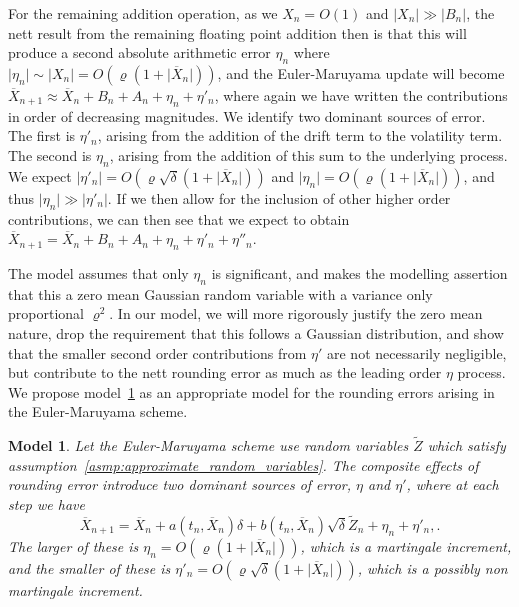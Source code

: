 \documentclass[manuscript,review]{acmart}
\newtheorem{model}{Model}[section]
\begin{document}
For the remaining addition operation, as we $ X_n = O(1) $ and $ \lvert X_n \rvert  \gg \lvert B_n \rvert  $, the nett result from the remaining floating point addition then is that this will produce a second absolute arithmetic error $ \eta_n $ where $ \lvert \eta_n \rvert  \sim \lvert X_n \rvert = O(\varrho (1 + \lvert \overline{X}_n\rvert ))$, and the Euler-Maruyama update will become
$ \overline{X}_{n+1} \approx \overline{X}_n + B_n + A_n + \eta_n + \eta'_n $, 
where again we have written the contributions in order of decreasing magnitudes. We identify two dominant sources of error. The first is $ \eta'_n $, arising from the addition of the drift term to the volatility term. The second is $ \eta_n $, arising from the addition of this sum to the underlying process.  We expect $ \lvert \eta'_n\rvert  = O(\varrho\sqrt{\delta} (1 + \lvert \overline{X}_n\rvert ))$ and $ \lvert \eta_n\rvert = O(\varrho (1 + \lvert \overline{X}_n\rvert ))$, and thus $ \lvert \eta_n\rvert  \gg \lvert \eta'_n\rvert  $.  If we then allow for the inclusion of other higher order contributions, we can then see that we expect to obtain
$ \overline{X}_{n+1} = \overline{X}_n + B_n + A_n + \eta_n + \eta'_n + \eta''_n $.

The \citet{arciniega2003rounding} model assumes that only $ \eta_n $ is significant, and makes the modelling assertion that this a zero mean Gaussian random variable with a variance only proportional $ \varrho^2 $. In our model, we will more rigorously justify the zero mean nature, drop the requirement that this follows a Gaussian distribution, and show that the smaller second order contributions from $ \eta' $ are not necessarily negligible, but contribute to the nett rounding error as much as the leading order $ \eta $ process. We propose model~\ref{model:rounding_errors} as an appropriate model for the rounding errors arising in the Euler-Maruyama scheme.  




\begin{model}
\label{model:rounding_errors}
Let the Euler-Maruyama scheme use random variables $ \widetilde{Z} $ which satisfy assumption~\ref{asmp:approximate_random_variables}. The composite effects of rounding error introduce two dominant sources of error, $ \eta $ and $ \eta' $, where at each step we have 
\begin{equation*}
\overline{X}_{n+1} = \overline{X}_n + a(t_n, \overline{X}_n) \delta +  b(t_n, \overline{X}_n) \sqrt{\delta} \widetilde{Z}_n + \eta_n + \eta'_n,.
\end{equation*}
The larger of these is $ \eta_n = O(\varrho (1 + \lvert\overline{X}_n\rvert)) $, which is a martingale increment, and the smaller of these  is $ \eta'_n = O(\varrho\sqrt{\delta} (1 + \lvert \overline{X}_n\rvert)) $, which is a possibly non martingale increment.
\end{model}
\end{document}
